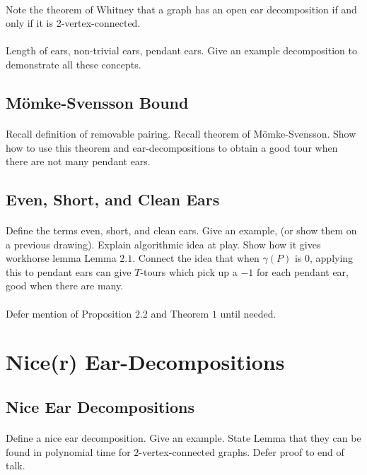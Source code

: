 \documentclass[letterpaper,12pt,oneside,onecolumn]{article}
\begin{document}
\paragraph{}
Note the theorem of Whitney that a graph has an open ear decomposition if and only if it is 2-vertex-connected.
\paragraph{}
Length of ears, non-trivial ears, pendant ears. Give an example decomposition to demonstrate all these concepts.
\subsection{M\"omke-Svensson Bound}
\paragraph{}
Recall definition of removable pairing. Recall theorem of M\"omke-Svensson. Show how to use this theorem and ear-decompositions to obtain a good tour when there are not many pendant ears.
\subsection{Even, Short, and Clean Ears}
\paragraph{}
Define the terms even, short, and clean ears. Give an example, (or show them on a previous drawing). Explain algorithmic idea at play. Show how it gives workhorse lemma Lemma $2.1$. Connect the idea that when $\gamma(P)$ is $0$, applying this to pendant ears can give $T$-tours which pick up a $-1$ for each pendant ear, good when there are many.
\paragraph{}
Defer mention of Proposition $2.2$ and Theorem $1$ until needed.
\section{Nice(r) Ear-Decompositions}
\subsection{Nice Ear Decompositions}
\paragraph{}
Define a nice ear decomposition. Give an example. State Lemma that they can be found in polynomial time for $2$-vertex-connected graphs. Defer proof to end of talk.
\end{document}
